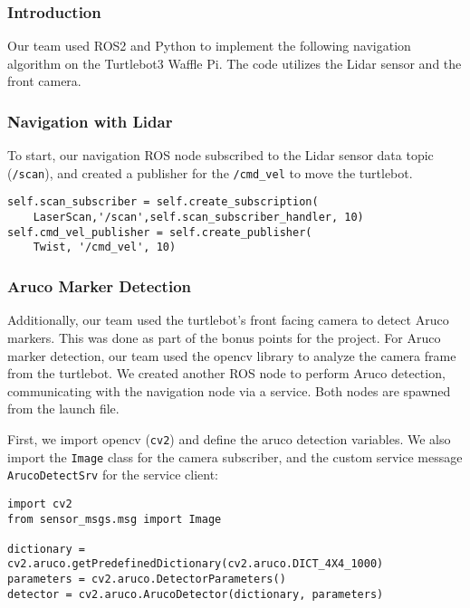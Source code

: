 \documentclass{article}
\begin{document}
\subsubsection{Introduction}

Our team used ROS2 and Python to implement the following navigation algorithm on the Turtlebot3 Waffle Pi. The code utilizes the Lidar sensor and the front camera.

\subsubsection{Navigation with Lidar}

To start, our navigation ROS node subscribed to the Lidar sensor data topic (\verb|/scan|), and created a publisher for the \verb|/cmd_vel| to move the turtlebot.

\begin{lstlisting}
self.scan_subscriber = self.create_subscription(
    LaserScan,'/scan',self.scan_subscriber_handler, 10)
self.cmd_vel_publisher = self.create_publisher(
    Twist, '/cmd_vel', 10)
\end{lstlisting}

\subsubsection{Aruco Marker Detection}

Additionally, our team used the turtlebot's front facing camera to detect Aruco markers. This was done as part of the bonus points for the project. For Aruco marker detection, our team used the opencv library to analyze the camera frame from the turtlebot. We created another ROS node to perform Aruco detection, communicating with the navigation node via a service. Both nodes are spawned from the launch file. \par

First, we import opencv (\verb|cv2|) and define the aruco detection variables. We also import the \verb|Image| class for the camera subscriber, and the custom service message \verb|ArucoDetectSrv| for the service client:

\begin{lstlisting}
import cv2
from sensor_msgs.msg import Image

dictionary = cv2.aruco.getPredefinedDictionary(cv2.aruco.DICT_4X4_1000)
parameters = cv2.aruco.DetectorParameters()
detector = cv2.aruco.ArucoDetector(dictionary, parameters)
\end{lstlisting}
\end{document}
